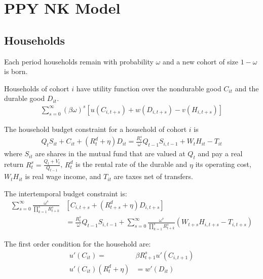 \documentclass[11pt]{article}
\begin{document}
\section{PPY NK Model}

\subsection{Households}

Each period households remain with probability $\omega$ and a new cohort of size $1-\omega$ is born.

Households of cohort $i$ have utility function over the nondurable good $C_{it}$ and the durable good $D_{it}$.
\begin{align*}
	\sum_{s=0}^{\infty}(\beta\omega)^s[u(C_{i,t+s}) + w(D_{i,t+s}) - v(H_{i,t+s})]
\end{align*}

The household budget constraint for a household of cohort $i$ is
\begin{align*}
    Q_t S_{it}+C_{it}+ (R_t^d + \eta) D_{it}  = \frac{R_{t}^s}{\omega} Q_{t-1} S_{i,t-1}  + W_tH_{it}  - T_{it}
\end{align*}
where $S_{it}$ are shares in the mutual fund that are valued at $Q_t$ and pay a real return $R_t^s=\frac{Q_t+V_t}{Q_{t-1}}$, $R_t^d$ is the rental rate of the durable and $\eta$ its operating cost, $W_tH_{it}$ is real wage income, and $T_{it}$ are taxes net of transfers.

The intertemporal budget constraint is:
\begin{align*}
	\sum_{s=0}^{\infty}\frac{\omega^s}{\prod_{k=1}^{s}R_{t+k}^s}&\left[C_{i,t+s}+ (R_{t+s}^d + \eta) D_{i,t+s}  \right] \\
	& = \frac{R_{t}^s}{\omega}Q_{t-1} S_{i,t-1} + \sum_{s=0}^{\infty}\frac{\omega^s}{\prod_{k=1}^{s}R_{t+k}^s}(W_{t+s}H_{i,t+s}  - T_{i,t+s})
\end{align*}

The first order condition for the household are:
%
\begin{align*}
	u'(C_{it})=&\beta  R_{t+1}^s u'(C_{i,t+1}) \\
	 u'(C_{it})(R_t^d + \eta)&= w'(D_{it})
\end{align*}
\end{document}
